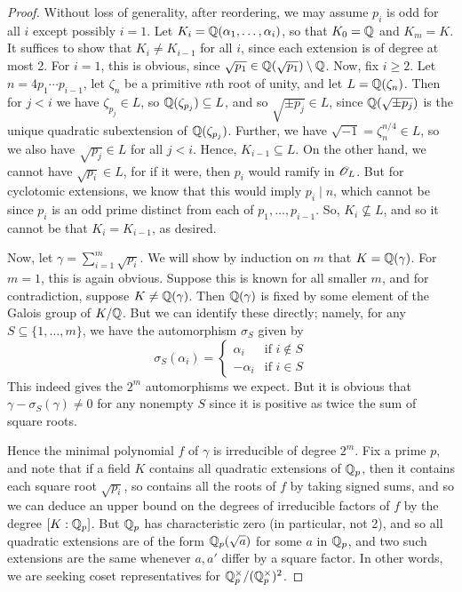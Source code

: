 \begin{proof}
	Without loss of generality, after reordering, we may assume $p_i$ is odd for all $i$ except possibly $i=1$. Let $K_i = \mathbb{Q}(\alpha_1,\ldots,\alpha_i)$, so that $K_0 = \mathbb{Q}$ and $K_m = K$. It suffices to show that $K_i \neq K_{i-1}$ for all $i$, since each extension is of degree at most 2. For $i = 1$, this is obvious, since $\sqrt{p_1} \in \mathbb{Q}(\sqrt{p_1}) \setminus \mathbb{Q}$. Now, fix $i \geq 2$. Let $n = 4p_1 \cdots p_{i-1}$, let $\zeta_n$ be a primitive $n$th root of unity, and let $L = \mathbb{Q}(\zeta_n)$. Then for $j < i$ we have $\zeta_{p_j} \in L$, so $\mathbb{Q}(\zeta_{p_j}) \subseteq L$, and so $\sqrt{\pm p_j} \in L$, since $\mathbb{Q}(\sqrt{\pm p_j})$ is the unique quadratic subextension of $\mathbb{Q}(\zeta_{p_j})$. Further, we have $\sqrt{-1} = \zeta_n^{n/4} \in L$, so we also have $\sqrt{p_j} \in L$ for all $j < i$. Hence, $K_{i-1} \subseteq L$. On the other hand, we cannot have $\sqrt{p_i} \in L$, for if it were, then $p_i$ would ramify in $\mathscr{O}_L$. But for cyclotomic extensions, we know that this would imply $p_i \mid n$, which cannot be since $p_i$ is an odd prime distinct from each of $p_1,\ldots,p_{i-1}$. So, $K_i \not\subseteq L$, and so it cannot be that $K_i = K_{i-1}$, as desired.
	
	Now, let $\gamma = \sum_{i=1}^m \sqrt{p_i}$. We will show by induction on $m$ that $K = \mathbb{Q}(\gamma)$. For $m=1$, this is again obvious. Suppose this is known for all smaller $m$, and for contradiction, suppose $K \neq \mathbb{Q}(\gamma)$. Then $\mathbb{Q}(\gamma)$ is fixed by some element of the Galois group of $K/\mathbb{Q}$. But we can identify these directly; namely, for any $S \subseteq \{1,\ldots,m\}$, we have the automorphism $\sigma_S$ given by
	\[ \sigma_S(\alpha_i) = \begin{cases} \alpha_i & \text{if }i \notin S \\ -\alpha_i & \text{if }i \in S \end{cases} \]
	This indeed gives the $2^m$ automorphisms we expect. But it is obvious that $\gamma - \sigma_S(\gamma) \neq 0$ for any nonempty $S$ since it is positive as twice the sum of square roots.
	
	Hence the minimal polynomial $f$ of $\gamma$ is irreducible of degree $2^m$. Fix a prime $p$, and note that if a field $K$ contains all quadratic extensions of $\mathbb{Q}_p$, then it contains each square root $\sqrt{p_i}$, so contains all the roots of $f$ by taking signed sums, and so we can deduce an upper bound on the degrees of irreducible factors of $f$ by the degree $[K:\mathbb{Q}_p]$. But $\mathbb{Q}_p$ has characteristic zero (in particular, not 2), and so all quadratic extensions are of the form $\mathbb{Q}_p(\sqrt{a})$ for some $a$ in $\mathbb{Q}_p$, and two such extensions are the same whenever $a,a'$ differ by a square factor. In other words, we are seeking coset representatives for $\mathbb{Q}_p^\times/(\mathbb{Q}_p^\times)^2$.
	

\end{proof}
